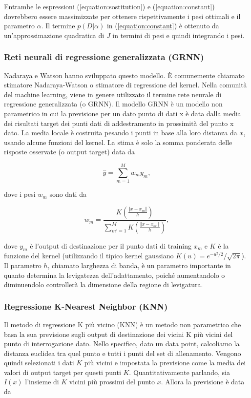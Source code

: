 \documentclass[12pt,a4paper]{report}
\begin{document}
Entrambe le espressioni (\ref{equation:sostitution}) e (\ref{equation:constant}) dovrebbero essere massimizzate per ottenere rispettivamente i pesi ottimali e il parametro $\alpha$. Il termine $p(D \vert \alpha)$ in (\ref{equation:constant}) è ottenuto da un'approssimazione quadratica di $J$ in termini di pesi e quindi integrando i pesi. 

\subsubsection{Reti neurali di regressione generalizzata (GRNN)}
Nadaraya e Watson hanno sviluppato questo modello.
È comunemente chiamato stimatore Nadaraya-Watson o stimatore di regressione del kernel. Nella comunità del machine learning, viene in genere utilizzato il termine rete neurale di regressione generalizzata (o GRNN). Il modello GRNN è un modello non parametrico in cui la previsione per un dato punto di dati x è data dalla media dei risultati target dei punti dati di addestramento in prossimità del punto x dato. La media locale è costruita pesando i punti in base alla loro distanza da $x$, usando alcune funzioni del kernel. La stima è solo la somma ponderata delle risposte osservate (o output target) data da

\begin{equation}
    { \displaystyle \hat{y} = \sum\limits_{m=1}^{M} w_my_m},
\end{equation}

dove i pesi $w_m$ sono dati da


\begin{equation}
    { \displaystyle w_m = \frac{K(\frac{\Vert x-x_m \Vert}{h})}{\sum_{m'=1}^{M}K(\frac{\Vert x-x_{m'} \Vert}{h})}},
\end{equation}

dove $y_m$ è l'output di destinazione per il punto dati di training $x_m$ e $K$ è la funzione del kernel (utilizzando il tipico kernel gaussiano $K(u) = e^{-u^2/2} / \sqrt{2\pi}$).
Il parametro $h$, chiamato larghezza di banda, è un parametro importante in quanto determina la levigatezza dell'adattamento, poiché aumentandolo o diminuendolo controllerà la dimensione della regione di levigatura.

\subsubsection{Regressione K-Nearest Neighbor (KNN)}
Il metodo di regressione K più vicino (KNN) è un metodo non parametrico che basa la sua previsione sugli output di destinazione dei vicini K più vicini del punto di interrogazione dato. Nello specifico, dato un data point, calcoliamo la distanza euclidea tra quel punto e tutti i punti del set di allenamento. Vengono quindi selezionati i dati $K$ più vicini e impostata la previsione come la media dei valori di output target per questi punti $K$. Quantitativamente parlando, sia $I(x)$ l'insieme di $K$ vicini più prossimi del punto $x$. Allora la previsione è data da
\end{document}
